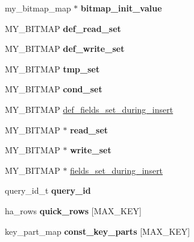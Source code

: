 \begin{DoxyCompactItemize}
my\+\_\+bitmap\+\_\+map $\ast$ {\bfseries bitmap\+\_\+init\+\_\+value}
\item 
\mbox{\label{structTABLE_aae5e8aa3207506ad2dc679519627c135}} 
M\+Y\+\_\+\+B\+I\+T\+M\+AP {\bfseries def\+\_\+read\+\_\+set}
\item 
\mbox{\label{structTABLE_ada7d47b7d30a9b480b75099dd34f4563}} 
M\+Y\+\_\+\+B\+I\+T\+M\+AP {\bfseries def\+\_\+write\+\_\+set}
\item 
\mbox{\label{structTABLE_aac73751a3de72fb801523e318db5a3af}} 
M\+Y\+\_\+\+B\+I\+T\+M\+AP {\bfseries tmp\+\_\+set}
\item 
\mbox{\label{structTABLE_ac0fc1b03160dab161cab2b6d31684f29}} 
M\+Y\+\_\+\+B\+I\+T\+M\+AP {\bfseries cond\+\_\+set}
\item 
M\+Y\+\_\+\+B\+I\+T\+M\+AP \mbox{\hyperlink{structTABLE_adc4c495f334d7d4f3822800df766f246}{def\+\_\+fields\+\_\+set\+\_\+during\+\_\+insert}}
\item 
\mbox{\label{structTABLE_a7ba5116b879f7519ab38c0049106c486}} 
M\+Y\+\_\+\+B\+I\+T\+M\+AP $\ast$ {\bfseries read\+\_\+set}
\item 
\mbox{\label{structTABLE_afbd0be22b3e09e76ffc38f08d04ff9a8}} 
M\+Y\+\_\+\+B\+I\+T\+M\+AP $\ast$ {\bfseries write\+\_\+set}
\item 
M\+Y\+\_\+\+B\+I\+T\+M\+AP $\ast$ \mbox{\hyperlink{structTABLE_a409fb1cb388b91a9bccf07d9e5cea8c6}{fields\+\_\+set\+\_\+during\+\_\+insert}}
\item 
\mbox{\label{structTABLE_a02c249be928b0e68a9c56e0345d3cd28}} 
query\+\_\+id\+\_\+t {\bfseries query\+\_\+id}
\item 
\mbox{\label{structTABLE_a46aef02528737e99f9a4977fe46858dd}} 
ha\+\_\+rows {\bfseries quick\+\_\+rows} \mbox{[}M\+A\+X\+\_\+\+K\+EY\mbox{]}
\item 
\mbox{\label{structTABLE_aa24f2d7d04a070d6ea419a50d5ae32e4}} 
key\+\_\+part\+\_\+map {\bfseries const\+\_\+key\+\_\+parts} \mbox{[}M\+A\+X\+\_\+\+K\+EY\mbox{]}
\item 
\mbox{\label{structTABLE_afc47fda43a08cb4c89af499687666820}} 

\end{DoxyCompactItemize}
